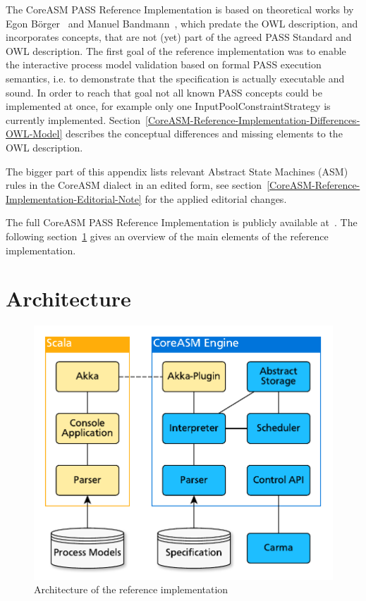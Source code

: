 
\footnotesize

\captionsetup{font=footnotesize}

The CoreASM PASS Reference Implementation is based on theoretical works
by Egon Börger~\cite{boerger2011interpreter} and Manuel Bandmann~\cite{bandmann2014spezifikation}, which predate
the OWL description, and incorporates concepts, that are not (yet) part of the agreed PASS Standard and OWL description.
The first goal of the reference implementation was to enable the interactive process model validation
based on formal PASS execution semantics, i.e. to demonstrate that the specification is actually executable and sound.
In order to reach that goal not all known PASS concepts could be implemented at once, for example
only one InputPoolConstraintStrategy is currently implemented.
Section~\ref{CoreASM-Reference-Implementation-Differences-OWL-Model} describes the conceptual differences and
missing elements to the OWL description.

The bigger part of this appendix lists relevant Abstract State Machines (ASM)~\cite{book:ASM-2003} rules
in the CoreASM dialect in an edited form,
see section~\ref{CoreASM-Reference-Implementation-Editorial-Note} for the applied editorial changes.

The full CoreASM PASS Reference Implementation is publicly available at~\cite{Web:PASS-CoreASM}.
The following section~\ref{CoreASM-Reference-Implementation-Architecture} gives an overview of the
main elements of the reference implementation.


\section{Architecture}
\label{CoreASM-Reference-Implementation-Architecture}

\begin{figure}[htbp]
    \centering
    \includegraphics[width=0.7\linewidth]{Figures/CoreASM/ArchitekturKonsoleCoreASM}
    \caption{Architecture of the reference implementation}
    \label{fig:coreasm_architecture}
\end{figure}

